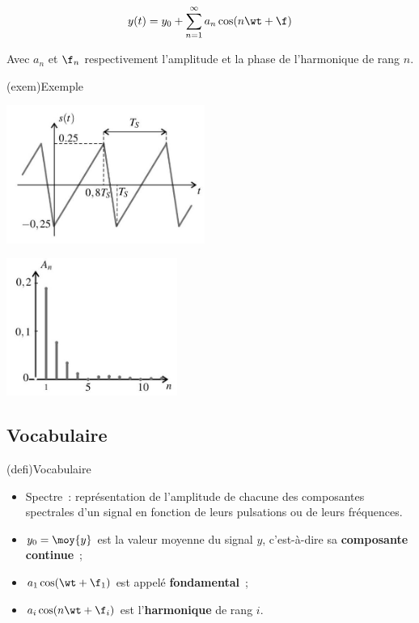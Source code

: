 \documentclass[../main/main.tex]{subfiles}
\begin{document}
{\begin{tcb}
	\[
		y(t) = y_0 + \sum_{n=1}^{\infty} a_n \cos(n\wt + \f)
	\]

	Avec $a_n$ et $\f_n$ respectivement l'amplitude et la phase de l'harmonique de
	rang $n$.
\end{tcb}


\begin{tcb}[sidebyside](exem){Exemple}
	\begin{center}
		\includegraphics[height=4.5cm]{tp15_spectre-temp}
	\end{center}
	\tcblower
	\begin{center}
		\includegraphics[height=4.5cm]{tp15_spectre-f}
	\end{center}
\end{tcb}

\subsection{Vocabulaire}

\begin{tcb}(defi){Vocabulaire}
	\begin{itemize}
		\item Spectre~: représentation de l'amplitude de chacune des composantes
		      spectrales d'un signal en fonction de leurs pulsations ou de leurs
		      fréquences.
		\item $y_0 = \moy{y}$ est la valeur moyenne du signal $y$, c'est-à-dire sa
		      \textbf{composante continue}~;
		\item $a_1 \cos(\wt + \f_1)$ est appelé
		      \textbf{fondamental}~;
		\item $a_i \cos(n\wt + \f_i)$ est l'\textbf{harmonique} de
		      rang $i$.
	\end{itemize}
\end{tcb}

}
\end{document}
